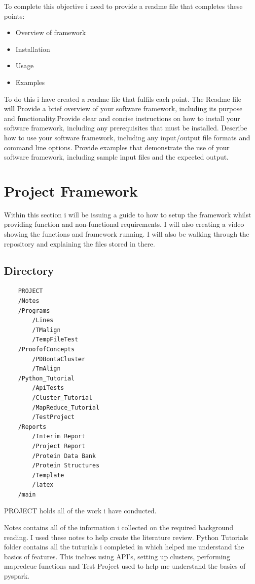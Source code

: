 \documentclass[]{final_report}
\begin{document}
To complete this objective i need to provide a readme file that completes these points:

\begin{itemize}
    \item Overview of framework
    \item Installation
    \item Usage
    \item Examples
\end{itemize}

To do this i have created a readme file that fulfils each point. The Readme file will Provide a brief overview of your software framework, including its purpose and functionality.Provide clear and concise instructions on how to install your software framework, including any prerequisites that must be installed. Describe how to use your software framework, including any input/output file formats and command line options. Provide examples that demonstrate the use of your software framework, including sample input files and the expected output.

\section{Project Framework}
Within this section i will be issuing a guide to how to setup the framework whilst providing function and non-functional requirements. I will also creating a video showing the functions and framework running. I will also be walking through the repository and explaining the files stored in there.


\subsection{Directory}

\begin{lstlisting}
    PROJECT
    /Notes
    /Programs
        /Lines
        /TMalign
        /TempFileTest
    /ProofofConcepts
        /PDBontaCluster
        /TmAlign
    /Python_Tutorial
        /ApiTests
        /Cluster_Tutorial
        /MapReduce_Tutorial
        /TestProject
    /Reports
        /Interim Report
        /Project Report
        /Protein Data Bank
        /Protein Structures
        /Template
        /latex
    /main
\end{lstlisting}

PROJECT holds all of the work i have conducted. 

Notes contains all of the information i collected on the required background reading. I used these notes to help create the literature review. Python Tutorials folder contains all the tuturials i completed in which helped me understand the basics of features. This inclues using API's, setting up clusters, performing mapredcue functions and Test Project used to help me understand the basics of pyspark.
\end{document}
